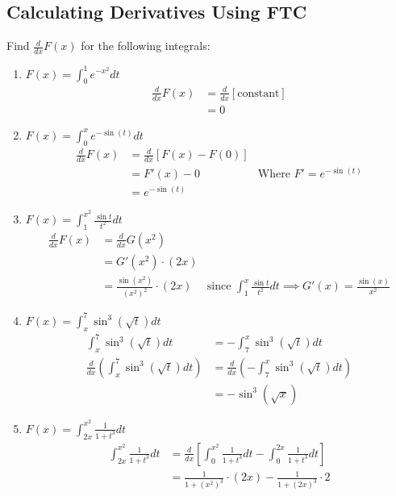 \documentclass{article}
\begin{document}
\subsection{Calculating Derivatives Using FTC}
Find $\frac{d}{dx} F(x)$ for the following integrals:
\begin{enumerate}
    \item $F(x) = \int_0^1 e^{-x^2} dt$
    \begin{align*}
        \frac{d}{dx} F(x) & = \frac{d}{dx} [\text{constant}]\\
        & = 0
    \end{align*}
    
    \item $F(x) = \int_0^x e^{-\sin(t)} dt$
    \begin{align*}
        \frac{d}{dx} F(x) & = \frac{d}{dx}[F(x) - F(0)]\\
        & = F'(x) - 0 & \text{Where } F' = e^{-\sin(t)}\\
        & = e^{-\sin(t)}
    \end{align*}
    
    \item $F(x) = \int_1^{x^2} \frac{\sin t}{t^2} dt$
    \begin{align*}
        \frac{d}{dx} F(x) & = \frac{d}{dx} G(x^2)\\
        & = G'(x^2) \cdot (2x)\\
        & = \frac{\sin(x^2)}{(x^2)^2} \cdot (2x) & \text{since } \int_1^x \frac{\sin t}{t^2} dt \implies G'(x) = \frac{\sin(x)}{x^2}
    \end{align*}
    
    \item $F(x) = \int_x^7 \sin^3(\sqrt{t}) dt$
    \begin{align*}
        \int_x^7 \sin^3(\sqrt{t}) dt & = - \int_7^x \sin^3(\sqrt{t}) dt\\
        \frac{d}{dx} \left( \int_x^7 \sin^3(\sqrt{t}) dt \right) & = \frac{d}{dx} \left( - \int_7^x \sin^3(\sqrt{t}) dt \right)\\
        & = -\sin^3(\sqrt{x})
    \end{align*}
    
    \item $F(x) = \int_{2x}^{x^2} \frac{1}{1 + t^3} dt$
    \begin{align*}
        \int_{2x}^{x^2} \frac{1}{1 + t^3} dt & = \frac{d}{dx} \left[ \int_0^{x^2} \frac{1}{1 + t^3} dt - \int_0^{2x} \frac{1}{1 + t^3} dt \right]\\
        & = \frac{1}{1 + (x^2)^3} \cdot (2x) - \frac{1}{1 + (2x)^3} \cdot 2
    \end{align*}
\end{enumerate}
\end{document}
